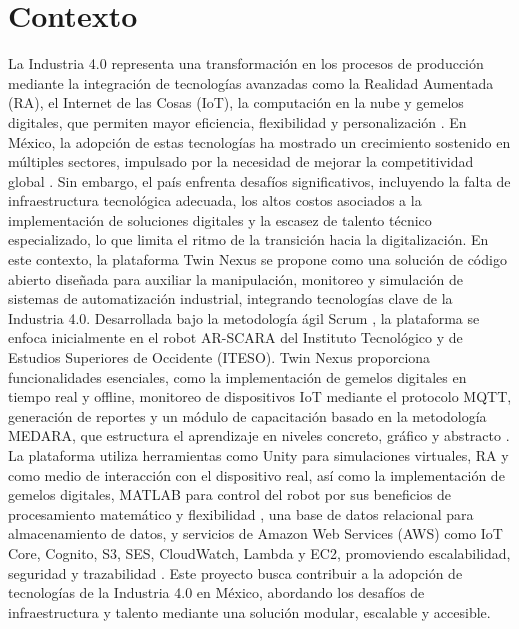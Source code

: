 \documentclass[12pt,letterpaper]{report}
\begin{document}
	\section{Contexto}
	La Industria 4.0 representa una transformación en los procesos de producción mediante la integración de tecnologías avanzadas como la Realidad Aumentada (RA), el Internet de las Cosas (IoT), la computación en la nube y gemelos digitales, que permiten mayor eficiencia, flexibilidad y personalización \cite{garcia_industria_adoption_2023}. En México, la adopción de estas tecnologías ha mostrado un crecimiento sostenido en múltiples sectores, impulsado por la necesidad de mejorar la competitividad global \cite{martinez_industria_mexico_2023}. Sin embargo, el país enfrenta desafíos significativos, incluyendo la falta de infraestructura tecnológica adecuada, los altos costos asociados a la implementación de soluciones digitales y la escasez de talento técnico especializado, lo que limita el ritmo de la transición hacia la digitalización.
	En este contexto, la plataforma Twin Nexus se propone como una solución de código abierto diseñada para auxiliar la manipulación, monitoreo y simulación de sistemas de automatización industrial, integrando tecnologías clave de la Industria 4.0. Desarrollada bajo la metodología ágil Scrum \cite{rodriguez_scrum_pcs_2023}, la plataforma se enfoca inicialmente en el robot AR-SCARA del Instituto Tecnológico y de Estudios Superiores de Occidente (ITESO). Twin Nexus proporciona funcionalidades esenciales, como la implementación de gemelos digitales en tiempo real y offline, monitoreo de dispositivos IoT mediante el protocolo MQTT, generación de reportes y un módulo de capacitación basado en la metodología MEDARA, que estructura el aprendizaje en niveles concreto, gráfico y abstracto \cite{zamora_medara_2022}. La plataforma utiliza herramientas como Unity para simulaciones virtuales, RA y como medio de interacción con el dispositivo real, así como la implementación de gemelos digitales, MATLAB para control del robot por sus beneficios de procesamiento matemático y flexibilidad \cite{mathworks_scara_2024}, una base de datos relacional para almacenamiento de datos, y servicios de Amazon Web Services (AWS) como IoT Core, Cognito, S3, SES, CloudWatch, Lambda y EC2, promoviendo escalabilidad, seguridad y trazabilidad \cite{aws_iot_industrial_2024}.
	Este proyecto busca contribuir a la adopción de tecnologías de la Industria 4.0 en México, abordando los desafíos de infraestructura y talento mediante una solución modular, escalable y accesible.
	
\end{document}
